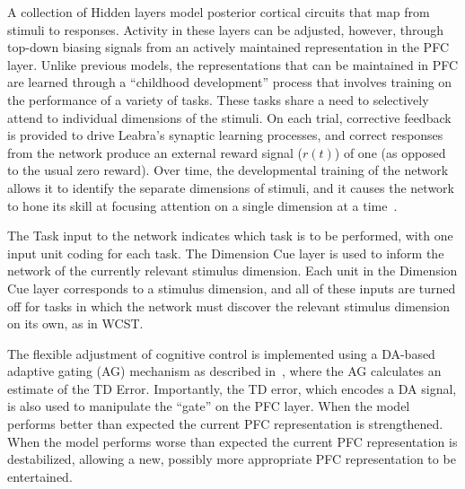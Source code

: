 A collection of Hidden layers model posterior cortical circuits that
map from stimuli to responses.  Activity in these layers can be
adjusted, however, through top-down biasing signals from an actively
maintained representation in the PFC layer.  Unlike previous models,
the representations that can be maintained in PFC are learned through
a ``childhood development'' process that involves training
on the performance of a variety of tasks.  These tasks
share a need to selectively attend to individual dimensions of the
stimuli.  On each trial, corrective feedback is provided to drive
Leabra's synaptic learning processes, and correct responses from the
network produce an external reward signal ($r(t)$) of one (as opposed
to the usual zero reward).  Over time, the developmental training of
the network allows it to identify the separate dimensions of stimuli,
and it causes the network to hone its skill at focusing attention on a
single dimension at a time~\cite{RougierNP:2005:XT}.

The Task input to the network indicates which task is to be performed,
with one input unit coding for each task.  The Dimension Cue layer is
used to inform the network of the currently relevant stimulus
dimension.   Each
unit in the Dimension Cue layer corresponds to a stimulus dimension,
and all of these inputs are turned off for tasks in which the network
must discover the relevant stimulus dimension on its own, as in WCST.

The flexible adjustment of cognitive control is implemented using a
DA-based adaptive gating (AG) mechanism as described in~\cite{RougierNP:2005:XT}, where the AG calculates an estimate of the TD Error.  
Importantly, the TD error, which encodes a DA
signal, is also used to manipulate the ``gate'' on the PFC layer.
When the model performs better than expected the
current PFC representation is strengthened.
When the model performs worse than expected the
current PFC representation is destabilized, allowing a new, possibly
more appropriate PFC representation to be entertained.  

